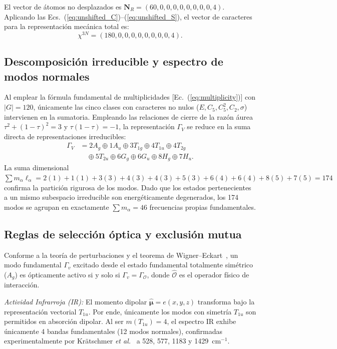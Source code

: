 El vector de átomos no desplazados es $\mathbf{N}_R = (60, 0, 0, 0, 0, 0, 0, 0, 0, 4)$. Aplicando las Ecs.~(\ref{eq:unshifted_C})--(\ref{eq:unshifted_S}), el vector de caracteres para la representación mecánica total es:
\begin{equation}
\chi^{3N} = (180, 0, 0, 0, 0, 0, 0, 0, 0, 4).
\end{equation}

\subsection{Descomposición irreducible y espectro de modos normales}
Al emplear la fórmula fundamental de multiplicidades [Ec.~(\ref{eq:multiplicity})] con $|G|=120$, únicamente las cinco clases con caracteres no nulos ($E, C_5, C_5^2, C_2, \sigma$) intervienen en la sumatoria. Empleando las relaciones de cierre de la razón áurea $\tau^2 + (1-\tau)^2 = 3$ y $\tau(1-\tau) = -1$, la representación $\Gamma_V$ se reduce en la suma directa de representaciones irreducibles:
\begin{align}
\Gamma_V &= 2A_g \oplus 1A_u \oplus 3T_{1g} \oplus 4T_{1u} \oplus 4T_{2g} \nonumber \\
         &\quad \oplus 5T_{2u} \oplus 6G_g \oplus 6G_u \oplus 8H_g \oplus 7H_u.
\label{eq:c60_vibrational_spectrum}
\end{align}
La suma dimensional $\sum m_\alpha \ell_\alpha = 2(1)+1(1)+3(3)+4(3)+4(3)+5(3)+6(4)+6(4)+8(5)+7(5)=174$ confirma la partición rigurosa de los modos. Dado que los estados pertenecientes a un mismo subespacio irreducible son energéticamente degenerados, los 174 modos se agrupan en exactamente $\sum m_\alpha = 46$ frecuencias propias fundamentales.

\subsection{Reglas de selección óptica y exclusión mutua}
Conforme a la teoría de perturbaciones y el teorema de Wigner--Eckart~\cite{Wigner1959, Ramadevi2019}, un modo fundamental $\Gamma_v$ excitado desde el estado fundamental totalmente simétrico ($A_g$) es ópticamente activo si y solo si $\Gamma_v = \Gamma_{\mathcal{O}}$, donde $\hat{\mathcal{O}}$ es el operador físico de interacción.

\textit{Actividad Infrarroja (IR):} El momento dipolar $\hat{\bm{\mu}} = e(x,y,z)$ transforma bajo la representación vectorial $T_{1u}$. Por ende, únicamente los modos con simetría $T_{1u}$ son permitidos en absorción dipolar. Al ser $m(T_{1u}) = 4$, el espectro IR exhibe únicamente 4 bandas fundamentales (12 modos normales), confirmadas experimentalmente por Krätschmer \emph{et al.}~\cite{Kratschmer1990} a 528, 577, 1183 y 1429~cm$^{-1}$.


